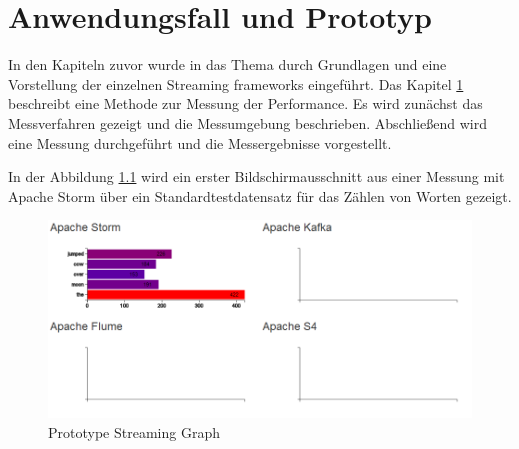 \chapter{Anwendungsfall und Prototyp}
\label{chapter:prototype}

In den Kapiteln zuvor wurde in das Thema durch Grundlagen und eine Vorstellung der einzelnen Streaming frameworks eingeführt. Das Kapitel \ref{chapter:prototype} beschreibt eine Methode zur Messung der Performance. Es wird zunächst das Messverfahren gezeigt und die Messumgebung beschrieben. Abschließend wird eine Messung durchgeführt und die Messergebnisse vorgestellt.

In der Abbildung \ref{fig:prototypeStreamingGraph} wird ein erster Bildschirmausschnitt aus einer Messung mit Apache Storm über ein Standardtestdatensatz für das Zählen von Worten gezeigt.

\begin{figure}[htb!]
\centering
\includegraphics[width=1.0\textwidth]{bilder/PrototypeStreamingGraph.png}
\caption{Prototype Streaming Graph
\label{fig:prototypeStreamingGraph}}
\end{figure}

